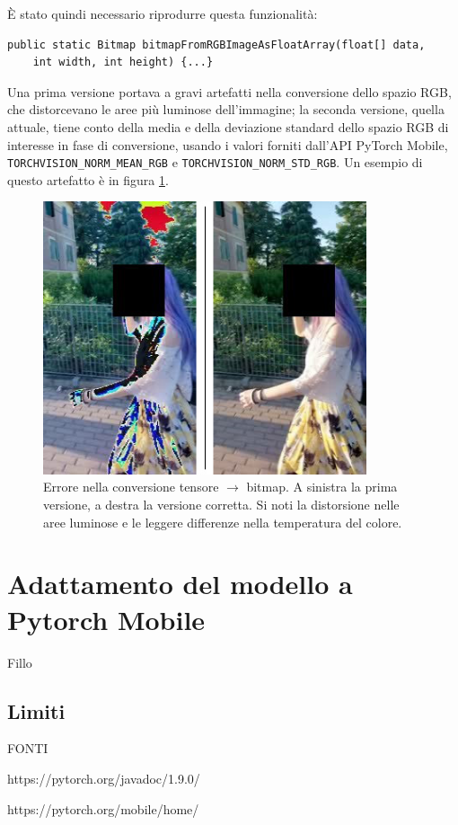 È stato quindi necessario riprodurre questa funzionalità:

\begin{lstlisting}
public static Bitmap bitmapFromRGBImageAsFloatArray(float[] data, 
    int width, int height) {...}
\end{lstlisting}

Una prima versione portava a gravi artefatti nella conversione dello spazio RGB, che 
distorcevano le aree più luminose dell'immagine; la seconda versione, quella attuale, 
tiene conto della media e della deviazione standard dello spazio RGB di interesse in fase di
conversione, usando i valori forniti dall'API PyTorch Mobile, 
\texttt{TORCHVISION\_NORM\_MEAN\_RGB} e \texttt{TORCHVISION\_NORM\_STD\_RGB}. Un esempio di 
questo artefatto è in figura \ref{fig:img_conversion_error}.

\begin{figure}[!bh]
    \centering
    \includegraphics[width=0.85\textwidth]{img/conversione_img_errore.jpg}
    \caption{Errore nella conversione tensore $\rightarrow$ bitmap. A sinistra la prima versione, 
    a destra la versione corretta. Si noti la distorsione nelle aree luminose e le leggere
    differenze nella temperatura del colore.}
    \label{fig:img_conversion_error}
\end{figure}


\FloatBarrier

\section{Adattamento del modello a Pytorch Mobile}
Fillo

\subsection{Limiti}




FONTI

https://pytorch.org/javadoc/1.9.0/

https://pytorch.org/mobile/home/